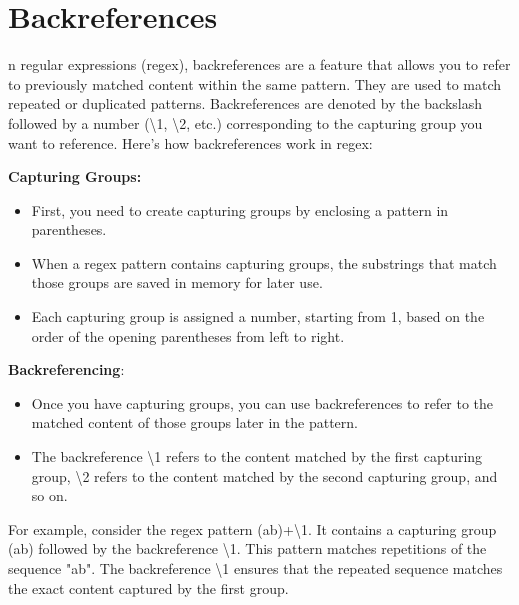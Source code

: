 \documentclass{report}
\begin{document}
    \pagebreak
    \bigbreak
    \noindent

    \section{Backreferences}
    n regular expressions (regex), backreferences are a feature that allows you to refer to previously matched content within the same pattern. They are used to match repeated or duplicated patterns. Backreferences are denoted by the backslash followed by a number (\textbackslash 1, \textbackslash 2, etc.) corresponding to the capturing group you want to reference.
    \bigbreak \noindent 
    Here's how backreferences work in regex:

    \bigbreak \noindent 
    \textbf{Capturing Groups:}
    \begin{itemize}
        \item First, you need to create capturing groups by enclosing a pattern in parentheses.
        \item When a regex pattern contains capturing groups, the substrings that match those groups are saved in memory for later use.
        \item Each capturing group is assigned a number, starting from 1, based on the order of the opening parentheses from left to right.
    \end{itemize}
    \textbf{Backreferencing}:
    \begin{itemize}
        \item Once you have capturing groups, you can use backreferences to refer to the matched content of those groups later in the pattern.
        \item The backreference \textbackslash 1 refers to the content matched by the first capturing group, \textbackslash 2 refers to the content matched by the second capturing group, and so on.
    \end{itemize}
    For example, consider the regex pattern (ab)+\textbackslash 1. It contains a capturing group (ab) followed by the backreference \textbackslash 1. This pattern matches repetitions of the sequence "ab". The backreference \textbackslash 1 ensures that the repeated sequence matches the exact content captured by the first group.

    \bigbreak \noindent 
    \bigbreak \noindent 
\end{document}

